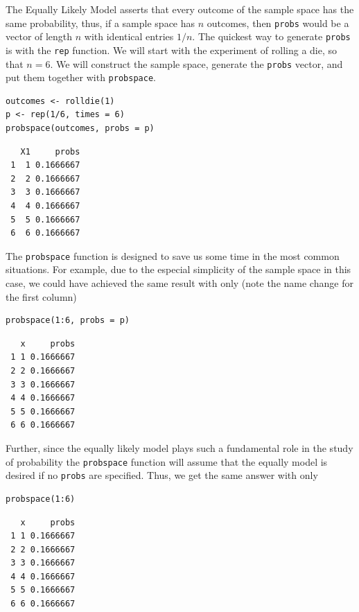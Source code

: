 \documentclass[captions=tableheading]{scrbook}
\begin{document}
\begin{example}
The Equally Likely Model asserts that every outcome of the sample space has the same probability, thus, if a sample space has \(n\) outcomes, then \texttt{probs} would be a vector of length \(n\) with identical entries \(1/n\). The quickest way to generate \texttt{probs} is with the \texttt{rep} function. We will start with the experiment of rolling a die, so that \(n=6\). We will construct the sample space, generate the \texttt{probs} vector, and put them together with \texttt{probspace}. 


\lstset{language=R}
\begin{lstlisting}
outcomes <- rolldie(1) 
p <- rep(1/6, times = 6) 
probspace(outcomes, probs = p)
\end{lstlisting}

\begin{verbatim}
   X1     probs
 1  1 0.1666667
 2  2 0.1666667
 3  3 0.1666667
 4  4 0.1666667
 5  5 0.1666667
 6  6 0.1666667
\end{verbatim}

The \texttt{probspace} function is designed to save us some time in the most common situations. For example, due to the especial simplicity of the sample space in this case, we could have achieved the same result with only (note the name change for the first column) 


\lstset{language=R}
\begin{lstlisting}
probspace(1:6, probs = p)
\end{lstlisting}

\begin{verbatim}
   x     probs
 1 1 0.1666667
 2 2 0.1666667
 3 3 0.1666667
 4 4 0.1666667
 5 5 0.1666667
 6 6 0.1666667
\end{verbatim}

Further, since the equally likely model plays such a fundamental role in the study of probability the \texttt{probspace} function will assume that the equally model is desired if no \texttt{probs} are specified. Thus, we get the same answer with only 


\lstset{language=R}
\begin{lstlisting}
probspace(1:6)
\end{lstlisting}

\begin{verbatim}
   x     probs
 1 1 0.1666667
 2 2 0.1666667
 3 3 0.1666667
 4 4 0.1666667
 5 5 0.1666667
 6 6 0.1666667
\end{verbatim}


\end{example}
\end{document}
